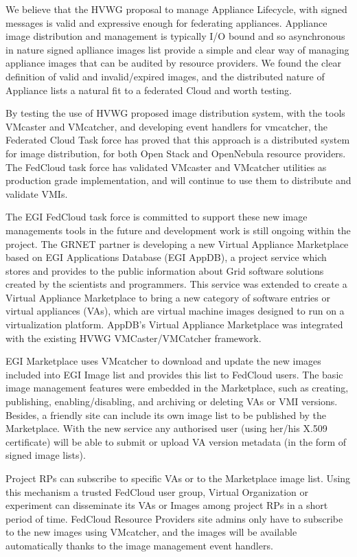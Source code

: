 \documentclass{cai}
\begin{document}
We believe that the HVWG proposal to manage Appliance Lifecycle, with signed messages is valid and expressive enough for federating appliances. 
Appliance image distribution and management is typically I/O bound and so asynchronous in nature signed aplliance images list provide a simple and clear way of managing appliance images that can be audited by resource providers. 
We found the clear definition of valid and invalid/expired images, and the distributed nature of Appliance lists a natural fit to a federated Cloud and worth testing.

By testing the use of HVWG proposed image distribution system, with the tools VMcaster and VMcatcher, and developing event handlers for vmcatcher, the Federated Cloud Task force has proved that this approach is a distributed system for image distribution, for both Open Stack and OpenNebula resource providers. 
The FedCloud task force has validated VMcaster and VMcatcher utilities as production grade implementation, and will continue to use them to distribute and validate VMIs.

The EGI FedCloud task force is committed to support these new image managements tools in the future and development work is still ongoing within the project. 
The GRNET partner is developing a new Virtual Appliance Marketplace based on EGI Applications Database (EGI AppDB), a project service which stores and provides to the public information about Grid software solutions created by the scientists and programmers.
This service was extended to create a Virtual Appliance Marketplace to bring a new category of software entries or virtual appliances (VAs), which are virtual machine images designed to run on a virtualization platform.
AppDB's Virtual Appliance Marketplace was integrated with the existing HVWG VMCaster/VMCatcher framework.

EGI Marketplace uses VMcatcher to download and update the new images included into EGI Image list and provides this list to FedCloud users.  
The basic image management features were embedded in the Marketplace, such as creating, publishing, enabling/disabling, and archiving or deleting VAs or VMI versions.
Besides, a friendly site can include its own image list to be published by the Marketplace. 
With the new service any authorised user (using her/his X.509 certificate) will be able to submit or upload VA version metadata (in the form of signed image lists).
 
Project RPs can subscribe to specific VAs or to the Marketplace image list. Using this mechanism a trusted FedCloud user group, Virtual Organization or experiment can disseminate its VAs or Images among project RPs in a short period of time.
FedCloud Resource Providers site admins only have to subscribe to the new images using VMcatcher, and the images will be available automatically thanks to the image management event handlers.
\end{document}
